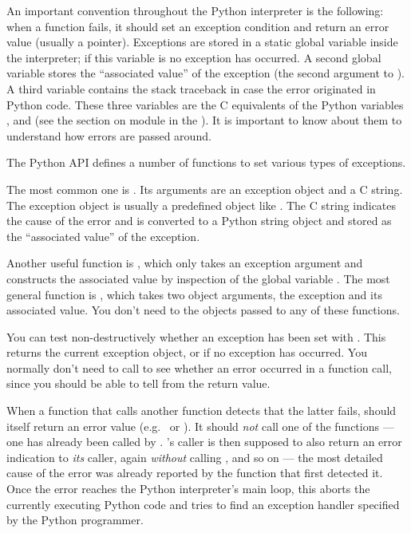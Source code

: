 \documentclass{manual}
\begin{document}
An important convention throughout the Python interpreter is the
following: when a function fails, it should set an exception condition
and return an error value (usually a \NULL{} pointer).  Exceptions
are stored in a static global variable inside the interpreter; if this
variable is \NULL{} no exception has occurred.  A second global
variable stores the ``associated value'' of the exception (the second
argument to ).  A third variable contains the stack
traceback in case the error originated in Python code.  These three
variables are the C equivalents of the Python variables
,  and  (see
the section on module  in the
).  It is
important to know about them to understand how errors are passed
around.

The Python API defines a number of functions to set various types of
exceptions.

The most common one is .  Its arguments
are an exception object and a C string.  The exception object is
usually a predefined object like .  The
C string indicates the cause of the error and is converted to a
Python string object and stored as the ``associated value'' of the
exception.

Another useful function is , which only
takes an exception argument and constructs the associated value by
inspection of the global variable .  The most
general function is , which takes two object
arguments, the exception and its associated value.  You don't need to
 the objects passed to any of these functions.

You can test non-destructively whether an exception has been set with
.  This returns the current exception object,
or \NULL{} if no exception has occurred.  You normally don't need
to call  to see whether an error occurred in a
function call, since you should be able to tell from the return value.

When a function  that calls another function  detects
that the latter fails,  should itself return an error value
(e.g.\ \NULL{} or ).  It should \emph{not} call one of the
 functions --- one has already been called by .
's caller is then supposed to also return an error indication
to \emph{its} caller, again \emph{without} calling ,
and so on --- the most detailed cause of the error was already
reported by the function that first detected it.  Once the error
reaches the Python interpreter's main loop, this aborts the currently
executing Python code and tries to find an exception handler specified
by the Python programmer.
\end{document}

